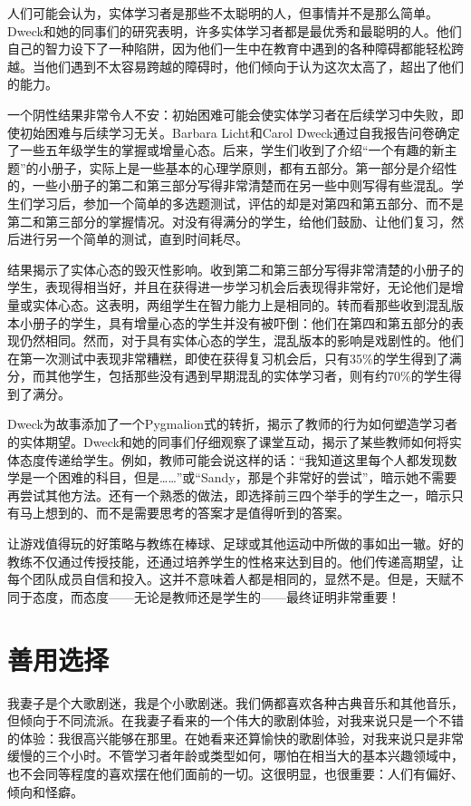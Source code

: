 人们可能会认为，实体学习者是那些不太聪明的人，但事情并不是那么简单。Dweck和她的同事们的研究表明，许多实体学习者都是最优秀和最聪明的人。他们自己的智力设下了一种陷阱，因为他们一生中在教育中遇到的各种障碍都能轻松跨越。当他们遇到不太容易跨越的障碍时，他们倾向于认为这次太高了，超出了他们的能力。

一个阴性结果非常令人不安：初始困难可能会使实体学习者在后续学习中失败，即使初始困难与后续学习无关。Barbara Licht和Carol Dweck通过自我报告问卷确定了一些五年级学生的掌握或增量心态。后来，学生们收到了介绍“一个有趣的新主题”的小册子，实际上是一些基本的心理学原则，都有五部分。第一部分是介绍性的，一些小册子的第二和第三部分写得非常清楚而在另一些中则写得有些混乱。学生们学习后，参加一个简单的多选题测试，评估的却是对第四和第五部分、而不是第二和第三部分的掌握情况。对没有得满分的学生，给他们鼓励、让他们复习，然后进行另一个简单的测试，直到时间耗尽。

结果揭示了实体心态的毁灭性影响。收到第二和第三部分写得非常清楚的小册子的学生，表现得相当好，并且在获得进一步学习机会后表现得非常好，无论他们是增量或实体心态。这表明，两组学生在智力能力上是相同的。转而看那些收到混乱版本小册子的学生，具有增量心态的学生并没有被吓倒：他们在第四和第五部分的表现仍然相同。然而，对于具有实体心态的学生，混乱版本的影响是戏剧性的。他们在第一次测试中表现非常糟糕，即使在获得复习机会后，只有35\%的学生得到了满分，而其他学生，包括那些没有遇到早期混乱的实体学习者，则有约70\%的学生得到了满分。

Dweck为故事添加了一个Pygmalion式的转折，揭示了教师的行为如何塑造学习者的实体期望。Dweck和她的同事们仔细观察了课堂互动，揭示了某些教师如何将实体态度传递给学生。例如，教师可能会说这样的话：“我知道这里每个人都发现数学是一个困难的科目，但是……”或“Sandy，那是个非常好的尝试”，暗示她不需要再尝试其他方法。还有一个熟悉的做法，即选择前三四个举手的学生之一，暗示只有马上想到的、而不是需要思考的答案才是值得听到的答案。

让游戏值得玩的好策略与教练在棒球、足球或其他运动中所做的事如出一辙。好的教练不仅通过传授技能，还通过培养学生的性格来达到目的。他们传递高期望，让每个团队成员自信和投入。这并不意味着人都是相同的，显然不是。但是，天赋不同于态度，而态度——无论是教师还是学生的——最终证明非常重要！

\section*{善用选择}

我妻子是个大歌剧迷，我是个小歌剧迷。我们俩都喜欢各种古典音乐和其他音乐，但倾向于不同流派。在我妻子看来的一个伟大的歌剧体验，对我来说只是一个不错的体验：我很高兴能够在那里。在她看来还算愉快的歌剧体验，对我来说只是非常缓慢的三个小时。不管学习者年龄或类型如何，哪怕在相当大的基本兴趣领域中，也不会同等程度的喜欢摆在他们面前的一切。这很明显，也很重要：人们有偏好、倾向和怪癖。

